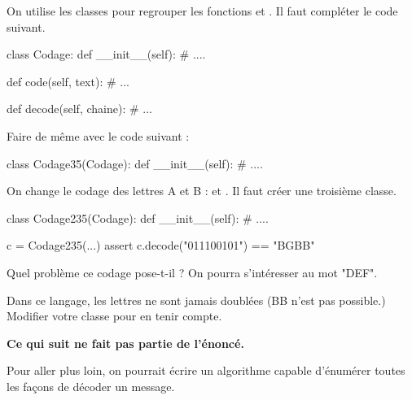 \begin{xexercice}
\exequest On utilise les classes pour regrouper les fonctions  et . Il faut compléter le code suivant.

\begin{verbatimx}
class Codage:
    def __init__(self):
        # ....

    def code(self, text):
        # ...

    def decode(self, chaine):
        # ...
\end{verbatimx}

\exequest Faire de même avec le code suivant :

\begin{verbatimx}
class Codage35(Codage):
    def __init__(self):
        # ....
\end{verbatimx}

\exequest On change le codage des lettres A et B :  et . Il faut créer une troisième classe.

\begin{verbatimx}
class Codage235(Codage):
    def __init__(self):
        # ....

c = Codage235(...)
assert c.decode("011100101") == "BGBB"
\end{verbatimx}

\exequest Quel problème ce codage pose-t-il ? On pourra s'intéresser au mot "DEF".

\exequest Dans ce langage, les lettres ne sont jamais doublées (BB n'est pas possible.)
Modifier votre classe pour en tenir compte.

\textbf{Ce qui suit ne fait pas partie de l'énoncé.}

Pour aller plus loin, on pourrait écrire un algorithme capable d'énumérer toutes les façons de décoder un message.

\end{xexercice}






%
